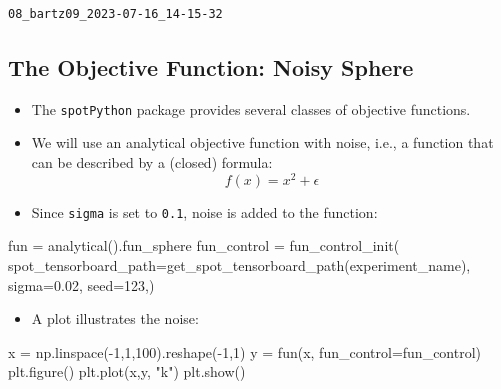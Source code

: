 \documentclass[
  letterpaper,
  DIV=11,
  numbers=noendperiod]{scrreprt}
\newenvironment{Shaded}{\begin{snugshade}}{\end{snugshade}}
\newcommand{\DecValTok}[1]{\textcolor[rgb]{0.68,0.00,0.00}{#1}}
\newcommand{\FloatTok}[1]{\textcolor[rgb]{0.68,0.00,0.00}{#1}}
\newcommand{\NormalTok}[1]{\textcolor[rgb]{0.00,0.23,0.31}{#1}}
\newcommand{\OperatorTok}[1]{\textcolor[rgb]{0.37,0.37,0.37}{#1}}
\newcommand{\StringTok}[1]{\textcolor[rgb]{0.13,0.47,0.30}{#1}}
\providecommand{\tightlist}{%
  \setlength{\itemsep}{0pt}\setlength{\parskip}{0pt}}\usepackage{longtable,booktabs,array}
\begin{document}
\begin{verbatim}
08_bartz09_2023-07-16_14-15-32
\end{verbatim}

\hypertarget{the-objective-function-noisy-sphere}{%
\subsection{The Objective Function: Noisy
Sphere}\label{the-objective-function-noisy-sphere}}

\begin{itemize}
\item
  The \texttt{spotPython} package provides several classes of objective
  functions.
\item
  We will use an analytical objective function with noise, i.e., a
  function that can be described by a (closed) formula:
  \[f(x) = x^2 + \epsilon\]
\item
  Since \texttt{sigma} is set to \texttt{0.1}, noise is added to the
  function:
\end{itemize}

\begin{Shaded}
\begin{Highlighting}[]
\NormalTok{fun }\OperatorTok{=}\NormalTok{ analytical().fun\_sphere}
\NormalTok{fun\_control }\OperatorTok{=}\NormalTok{ fun\_control\_init(}
\NormalTok{    spot\_tensorboard\_path}\OperatorTok{=}\NormalTok{get\_spot\_tensorboard\_path(experiment\_name),}
\NormalTok{    sigma}\OperatorTok{=}\FloatTok{0.02}\NormalTok{,}
\NormalTok{    seed}\OperatorTok{=}\DecValTok{123}\NormalTok{,)}
\end{Highlighting}
\end{Shaded}

\begin{itemize}
\tightlist
\item
  A plot illustrates the noise:
\end{itemize}

\begin{Shaded}
\begin{Highlighting}[]
\NormalTok{x }\OperatorTok{=}\NormalTok{ np.linspace(}\OperatorTok{{-}}\DecValTok{1}\NormalTok{,}\DecValTok{1}\NormalTok{,}\DecValTok{100}\NormalTok{).reshape(}\OperatorTok{{-}}\DecValTok{1}\NormalTok{,}\DecValTok{1}\NormalTok{)}
\NormalTok{y }\OperatorTok{=}\NormalTok{ fun(x, fun\_control}\OperatorTok{=}\NormalTok{fun\_control)}
\NormalTok{plt.figure()}
\NormalTok{plt.plot(x,y, }\StringTok{"k"}\NormalTok{)}
\NormalTok{plt.show()}
\end{Highlighting}
\end{Shaded}
\end{document}
